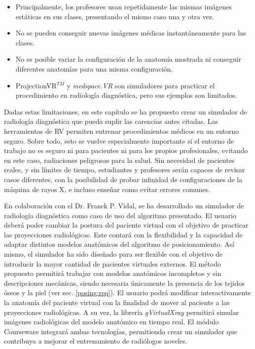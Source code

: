 \begin{itemize}
\item Principalmente, los profesores usan repetidamente las mismas imágenes estáticas en sus clases, presentando el mismo caso una y otra vez.
\item No se pueden conseguir nuevas imágenes médicas instantáneamente para las clases.
\item No es posible variar la configuración de la anatomía mostrada ni conseguir diferentes anatomías para una misma configuración.
\item ProjectionVR$^{TM}$\cite{shanahan2016student} y \emph{medspace.VR} \cite{medspace} son simuladores para practicar el procedimiento en radiología diagnóstica, pero sus ejemplos son limitados.
\end{itemize}

Dadas estas limitaciones, en este capítulo se ha propuesto crear un simulador de radiología diagnóstica que pueda suplir las carencias antes citadas. Las herramientas de \ac{RV} permiten entrenar procedimientos médicos en un entorno seguro. Sobre todo, esto se vuelve especialmente importante si el entorno de trabajo no es seguro ni para pacientes ni para los propios profesionales, evitando en este caso, radiaciones peligrosas para la salud. Sin necesidad de pacientes reales, y sin límites de tiempo, estudiantes y profesores serán capaces de revisar casos diferentes, con la posibilidad de probar infinidad de configuraciones de la máquina de rayos X, e incluso enseñar como evitar errores comunes.%




En colaboración con el Dr. Franck P. Vidal, se ha desarrollado un simulador de radiología diagnóstica como caso de uso del algoritmo presentado.  El usuario deberá poder cambiar la postura del paciente virtual con el objetivo de practicar las proyecciones radiológicas.
Este contará con la flexibilidad y la capacidad de %
adaptar distintos modelos anatómicos del algoritmo de posicionamiento.
Así mismo, el simulador ha sido diseñado para ser flexible con el objetivo de introducir la mayor cantidad de pacientes virtuales externos. El método propuesto permitirá trabajar con modelos anatómicos incompletos y sin descripciones mecánicas, siendo necesaria únicamente la presencia de los tejidos óseos y la piel (ver sec. \ref{posing:req}). El usuario podrá modificar interactivamente la anatomía del paciente virtual con la finalidad de mover al paciente a las proyecciones radiológicas. %
A su vez, la librería \emph{gVirtualXray} \cite{sujar:hal}  permitirá simular imágenes radiológicas del modelo anatómico en tiempo real. El módulo \ac{Courseware} integrará ambas tecnologías, permitiendo crear un simulador que contribuya a mejorar el entrenamiento de radiólogos noveles.


